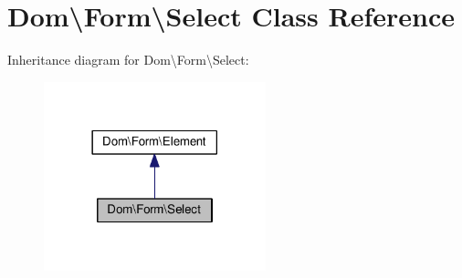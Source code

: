 \hypertarget{classDom_1_1Form_1_1Select}{\section{Dom\textbackslash{}Form\textbackslash{}Select Class Reference}
\label{classDom_1_1Form_1_1Select}
}


Inheritance diagram for Dom\textbackslash{}Form\textbackslash{}Select\+:\nopagebreak
\begin{figure}[H]
\begin{center}
\leavevmode
\includegraphics[width=182pt]{classDom_1_1Form_1_1Select__inherit__graph}
\end{center}
\end{figure}
